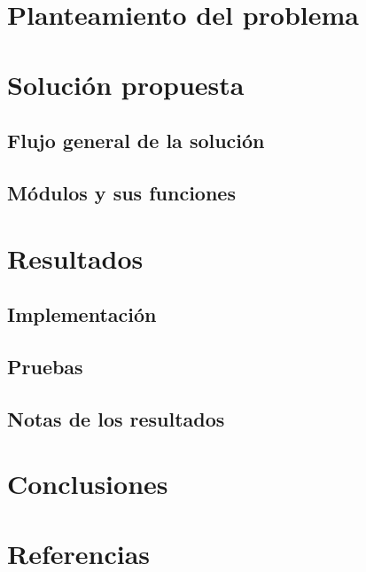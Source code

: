 \documentclass{report}
\begin{document}

    \tableofcontents

    \chapter{\LARGE{Planteamiento del problema}}
    


    \chapter{\LARGE{Solución propuesta}}

    \section{\Large{Flujo general de la solución}}
    


    \section{\Large{Módulos y sus funciones}}
    
    
    \chapter{\LARGE{Resultados}}

    \section{\Large{Implementación}}
    

    \section{\Large{Pruebas}}
    

    \section{\Large{Notas de los resultados}}
    

    \chapter{\LARGE{Conclusiones}}
    

    \newpage  
    \chapter*{Referencias}
    \printbibliography
\end{document}
